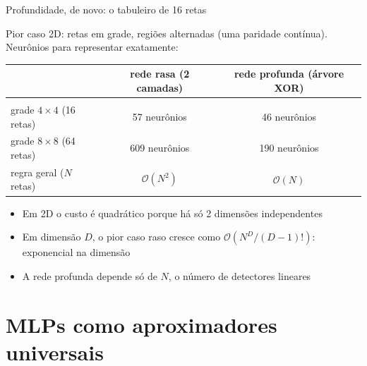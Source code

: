 \documentclass[aspectratio=169, 11pt]{beamer}
\begin{document}
\begin{frame}{Profundidade, de novo: o tabuleiro de 16 retas}

  Pior caso 2D: retas em grade, regiões alternadas (uma paridade contínua).
  Neurônios para representar exatamente:

  \medskip
  \begin{center}
    \small
    \begin{tabular}{lcc}
      & \textbf{rede rasa (2 camadas)} & \textbf{rede profunda (árvore XOR)}\\[2pt]
      \hline\\[-8pt]
      grade $4\times 4$ (16 retas)   & 57 neurônios  & 46 neurônios\\
      grade $8\times 8$ (64 retas)   & 609 neurônios & 190 neurônios\\
      regra geral ($N$ retas)        & $\mathcal{O}(N^2)$ & $\mathcal{O}(N)$\\
    \end{tabular}
  \end{center}

  \medskip
  \begin{itemize}\setlength{\itemsep}{0.25ex}
    \item Em 2D o custo é quadrático porque há só 2 dimensões independentes
    \item Em dimensão $D$, o pior caso raso cresce como
          $\mathcal{O}\!\left(N^D/(D-1)!\right)$: exponencial na dimensão
    \item A rede profunda depende só de $N$, o número de detectores lineares
  \end{itemize}
\end{frame}

\section{MLPs como aproximadores universais}
\end{document}
